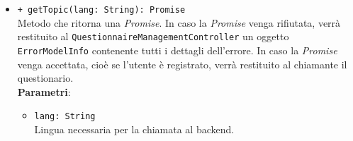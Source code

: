 \begin{itemize}
\begin{itemize}
\begin{itemize}
	\end{itemize}
	\item \texttt{+ getTopic(lang: String): Promise} \\ Metodo che ritorna una \textit{Promise}. In caso la \textit{Promise} venga rifiutata, verrà restituito al \texttt{QuestionnaireManagementController} un oggetto \texttt{ErrorModelInfo} contenente tutti i dettagli dell'errore. In caso la \textit{Promise} venga accettata, cioè se l'utente è registrato, verrà restituito al chiamante il questionario. \\
	\textbf{Parametri}:
	\begin{itemize}
		\item \texttt{lang: String} \\ Lingua necessaria per la chiamata al backend.
	\end{itemize}
\end{itemize}
\end{itemize}